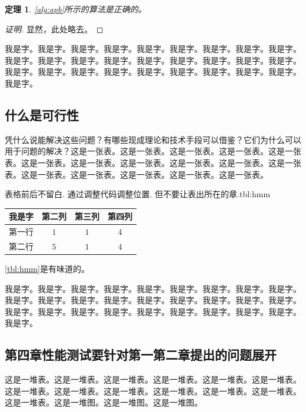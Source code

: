 \documentclass[supercite]{Experimental_Report}
\newcommand{\ralg}[1]{\autoref{alg:#1}}
\newcommand{\rtbl}[1]{\autoref{tbl:#1}}
\newtheorem{thm}{定理}[section]
\theoremstyle{definition}
\begin{document}
\begin{thm} \label{thm:gsb-apprx}
  \ralg{apb}所示的算法是正确的。
\end{thm}
\begin{proof}[证明]
  显然，此处略去。
\end{proof}

我是字。我是字。我是字。我是字。我是字。我是字。我是字。我是字。我是字。我是字。我是字。我是字。我是字。我是字。我是字。我是字。我是字。我是字。我是字。我是字。我是字。我是字。我是字。我是字。我是字。我是字。我是字。我是字。

\subsection{什么是可行性}

凭什么说能解决这些问题\cite{MIH2010IEEE}？有哪些现成理论和技术手段可以借鉴？它们为什么可以用于问题的解决？这是一张表。这是一张表。这是一张表。这是一张表。这是一张表。这是一张表。这是一张表。这是一张表。这是一张表。这是一张表。这是一张表。这是一张表。这是一张表。这是一张表。这是一张表。这是一张表。

\begin{generaltab}{表格前后不留白. 通过调整代码调整位置. 但不要让表出所在的章.}{tbl:hmm}
  \begin{tabular}{c|ccc}
    \toprule
    我是字 & 第二列 & 第三列 & 第四列 \\
    \midrule
    第一行 & $1$ & $1$ & $4$ \\
    第二行 & $5$ & $1$ & $4$ \\
    \bottomrule
  \end{tabular}
\end{generaltab}

\rtbl{hmm}是有味道的。

我是字。我是字。我是字。我是字。我是字。我是字。我是字。我是字。我是字。我是字。我是字。我是字。我是字。我是字。我是字。我是字。我是字。我是字。我是字。我是字。我是字。我是字。我是字。我是字。我是字。我是字。我是字。我是字。

\subsection{第四章性能测试要针对第一第二章提出的问题展开}

这是一堆\cite{Dai2008Semantic}表。这是一堆表。这是一堆表。这是一堆表。这是一堆表。这是一堆表。这是一堆表。这是一堆表。这是一堆表。这是一堆表。这是一堆表。这是一堆表。这是一堆表。这是一堆图。这是一堆图。这是一堆图。
\end{document}
